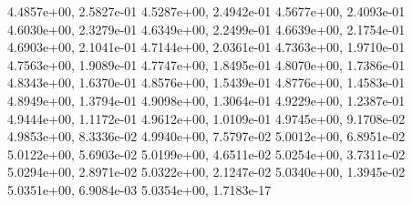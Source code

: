 {  4.4857e+00, 2.5827e-01
  4.5287e+00, 2.4942e-01
  4.5677e+00, 2.4093e-01
  4.6030e+00, 2.3279e-01
  4.6349e+00, 2.2499e-01
  4.6639e+00, 2.1754e-01
  4.6903e+00, 2.1041e-01
  4.7144e+00, 2.0361e-01
  4.7363e+00, 1.9710e-01
  4.7563e+00, 1.9089e-01
  4.7747e+00, 1.8495e-01
  4.8070e+00, 1.7386e-01
  4.8343e+00, 1.6370e-01
  4.8576e+00, 1.5439e-01
  4.8776e+00, 1.4583e-01
  4.8949e+00, 1.3794e-01
  4.9098e+00, 1.3064e-01
  4.9229e+00, 1.2387e-01
  4.9444e+00, 1.1172e-01
  4.9612e+00, 1.0109e-01
  4.9745e+00, 9.1708e-02
  4.9853e+00, 8.3336e-02
  4.9940e+00, 7.5797e-02
  5.0012e+00, 6.8951e-02
  5.0122e+00, 5.6903e-02
  5.0199e+00, 4.6511e-02
  5.0254e+00, 3.7311e-02
  5.0294e+00, 2.8971e-02
  5.0322e+00, 2.1247e-02
  5.0340e+00, 1.3945e-02
  5.0351e+00, 6.9084e-03
  5.0354e+00, 1.7183e-17
}

